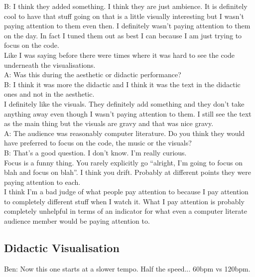 B: I think they added something. I think they are just ambience. It is definitely cool to have that stuff going on that is a little visually interesting but I wasn't paying attention to them even then. I definitely wasn't paying attention to them on the day. In fact I tuned them out as best I can because I am just trying to focus on the code.\\

Like I was saying before there were times where it was hard to see the code underneath the visualisations.\\

A: Was this during the aesthetic or didactic performance?\\

B: I think it was more the didactic and I think it was the text in the didactic ones and not in the aesthetic.\\

I definitely like the visuals. They definitely add something and they don't take anything away even though I wasn't paying attention to them. I still see the text as the main thing but the visuals are gravy and that was nice gravy.\\

A: The audience was reasonably computer literature. Do you think they would have preferred to focus on the code, the music or the visuals?\\

B: That's a good question. I don't know. I'm really curious.\\

Focus is a funny thing. You rarely explicitly go ``alright, I'm going to focus on blah and focus on blah''. I think you drift. Probably at different points they were paying attention to each.\\

I think I'm a bad judge of what people pay attention to because I pay attention to completely different stuff when I watch it. What I pay attention is probably completely unhelpful in terms of an indicator for what even a computer literate audience member would be paying attention to.\\

\subsection*{Didactic Visualisation}

Ben: Now this one starts at a slower tempo. Half the speed... 60bpm vs 120bpm.\\

